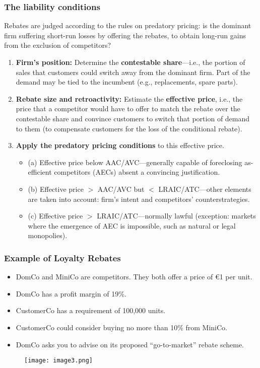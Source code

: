         \subsubsection{The liability conditions}

            Rebates are judged according to the rules on predatory pricing: is the dominant firm suffering short-run losses by offering the rebates, to obtain long-run gains from the exclusion of competitors?

            \begin{enumerate}
                \item \textbf{Firm’s position:} Determine the \textbf{contestable share}—i.e., the portion of sales that customers could switch away from the dominant firm. Part of the demand may be tied to the incumbent (e.g., replacements, spare parts).
                \item \textbf{Rebate size and retroactivity:} Estimate the \textbf{effective price}, i.e., the price that a competitor would have to offer to match the rebate over the contestable share and convince customers to switch that portion of demand to them (to compensate customers for the loss of the conditional rebate).
                \item \textbf{Apply the predatory pricing conditions} to this effective price.
                \begin{itemize}
                    \item (a) Effective price below AAC/AVC—generally capable of foreclosing as-efficient competitors (AECs) absent a convincing justification.
                    \item (b) Effective price \( > \) AAC/AVC but \( < \) LRAIC/ATC—other elements are taken into account: firm’s intent and competitors’ counterstrategies.
                    \item (c) Effective price \( > \) LRAIC/ATC—normally lawful (exception: markets where the emergence of AEC is impossible, such as natural or legal monopolies).
                \end{itemize}
            \end{enumerate}

        \subsubsection{Example of Loyalty Rebates}
            
            \begin{itemize}
                \item DomCo and MiniCo are competitors. They both offer a price of €1 per unit.
                \item DomCo has a profit margin of 19\%.
                \item CustomerCo has a requirement of 100,000 units.
                \item CustomerCo could consider buying no more than 10\% from MiniCo.
                \item DomCo asks you to advise on its proposed “go-to-market” rebate scheme.
            \end{itemize}

        \begin{figure}[ht]
            \centering
            \texttt{[image: image3.png]}
        \end{figure}

    